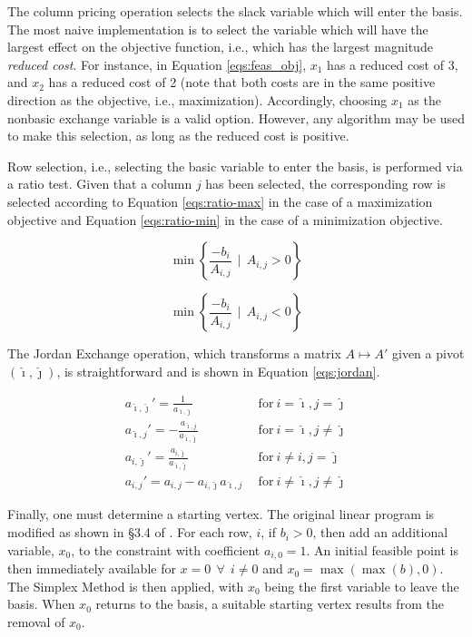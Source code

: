 The column pricing operation selects the slack variable which will enter the
basis. The most naive implementation is to select the variable which will have
the largest effect on the objective function, i.e., which has the largest
magnitude \textit{reduced cost}. For instance, in Equation \ref{eqs:feas_obj},
$x_1$ has a reduced cost of 3, and $x_2$ has a reduced cost of 2 (note that both
costs are in the same positive direction as the objective, i.e.,
maximization). Accordingly, choosing $x_1$ as the nonbasic exchange variable is
a valid option. However, any algorithm may be used to make this selection, as
long as the reduced cost is positive.

Row selection, i.e., selecting the basic variable to enter the basis, is
performed via a ratio test. Given that a column $j$ has been selected, the
corresponding row is selected according to Equation \ref{eqs:ratio-max} in the
case of a maximization objective and Equation \ref{eqs:ratio-min} in the case of
a minimization objective.

\begin{equation}\label{eqs:ratio-max}
  \min \left\{ \frac{-b_i}{A_{i,j}} \:\: | \:\: A_{i,j} > 0 \right\}
\end{equation}

\begin{equation}\label{eqs:ratio-min}
  \min \left\{ \frac{-b_i}{A_{i,j}} \:\: | \:\: A_{i,j} < 0 \right\}
\end{equation}

The Jordan Exchange operation, which transforms a matrix $A \mapsto A'$
given a pivot $(\hat{\imath}, \hat{\jmath})$, is straightforward and is shown in
Equation \ref{eqs:jordan}.

\begin{subequations}\label{eqs:jordan}
  \begin{align}
    a_{\hat{\imath},\hat{\jmath}}' = \frac{1}{a_{\hat{\imath},\hat{\jmath}}}
    &\:\: \text{for} \:
    i = \hat{\imath}, j = \hat{\jmath} \\
    a_{\hat{\imath},j}' = -\frac{a_{\hat{\imath},j}}{a_{\hat{\imath},\hat{\jmath}}}
    &\:\: \text{for} \:
    i = \hat{\imath}, j \neq \hat{\jmath} \\
    a_{i,\hat{\jmath}}' = \frac{a_{i,\hat{\jmath}}}{a_{\hat{\imath},\hat{\jmath}}}
    &\:\: \text{for} \:
    i \neq i, j = \hat{\jmath} \\
    a_{i,j}' = a_{i,j} - a_{i,\hat{\jmath}} a_{\hat{\imath},j}
    &\:\: \text{for} \:
    i \neq \hat{\imath}, j \neq \hat{\jmath}
  \end{align}
\end{subequations}

Finally, one must determine a starting vertex. The original linear program is
modified as shown in \S 3.4 of \cite{ferris_linear_2008}. For each row, $i$, if
$b_i > 0$, then add an additional variable, $x_0$, to the constraint with
coefficient $a_{i,0} = 1$. An initial feasible point is then immediately
available for $x = 0 \:\: \forall \:\: i \neq 0$ and $x_0
= \max(\max(b),0)$. The Simplex Method is then applied, with $x_0$ being the
first variable to leave the basis. When $x_0$ returns to the basis, a suitable
starting vertex results from the removal of $x_0$.

